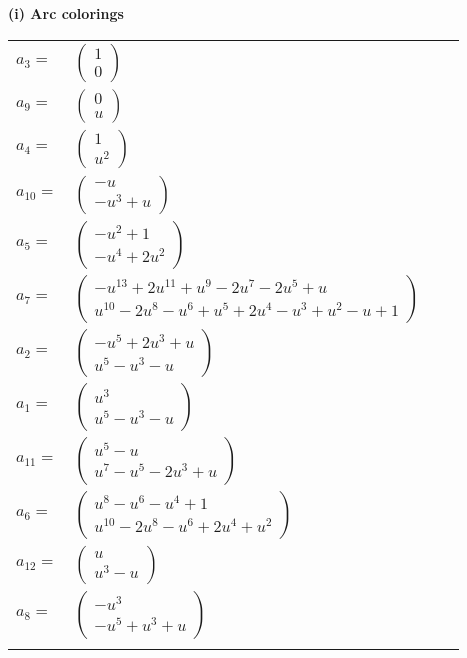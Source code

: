 \documentclass[1p]{elsarticle_modified}
\theoremstyle{definition}
\begin{document}
\flushleft \textbf{(i) Arc colorings}\\
\begin{tabular}{m{7pt} m{180pt} m{7pt} m{180pt} }
\flushright $a_{3}=$&$\begin{pmatrix}1\\0\end{pmatrix}$ \\
\flushright $a_{9}=$&$\begin{pmatrix}0\\u\end{pmatrix}$ \\
\flushright $a_{4}=$&$\begin{pmatrix}1\\u^2\end{pmatrix}$ \\
\flushright $a_{10}=$&$\begin{pmatrix}- u\\- u^3+u\end{pmatrix}$ \\
\flushright $a_{5}=$&$\begin{pmatrix}- u^2+1\\- u^4+2 u^2\end{pmatrix}$ \\
\flushright $a_{7}=$&$\begin{pmatrix}- u^{13}+2 u^{11}+u^9-2 u^7-2 u^5+u\\u^{10}-2 u^8- u^6+u^5+2 u^4- u^3+u^2- u+1\end{pmatrix}$ \\
\flushright $a_{2}=$&$\begin{pmatrix}- u^5+2 u^3+u\\u^5- u^3- u\end{pmatrix}$ \\
\flushright $a_{1}=$&$\begin{pmatrix}u^3\\u^5- u^3- u\end{pmatrix}$ \\
\flushright $a_{11}=$&$\begin{pmatrix}u^5- u\\u^7- u^5-2 u^3+u\end{pmatrix}$ \\
\flushright $a_{6}=$&$\begin{pmatrix}u^8- u^6- u^4+1\\u^{10}-2 u^8- u^6+2 u^4+u^2\end{pmatrix}$ \\
\flushright $a_{12}=$&$\begin{pmatrix}u\\u^3- u\end{pmatrix}$ \\
\flushright $a_{8}=$&$\begin{pmatrix}- u^3\\- u^5+u^3+u\end{pmatrix}$\\&\end{tabular}
\end{document}
